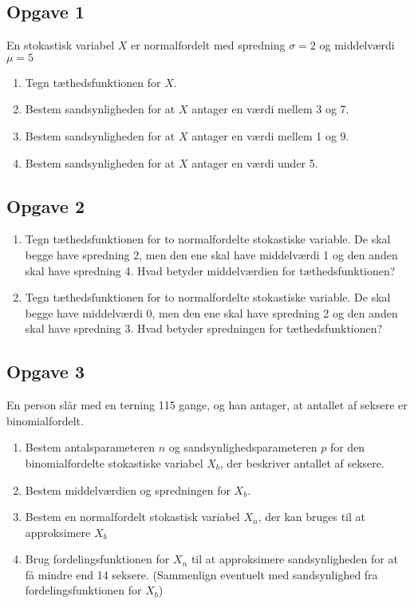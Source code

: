 
\subsection*{Opgave 1}
En stokastisk variabel $X$ er normalfordelt med spredning $\sigma = 2$ og middelværdi $\mu = 5$

\begin{enumerate}[label=\roman*)	]
	\item Tegn tæthedsfunktionen for $X$. 
	\item Bestem sandsynligheden for at $X$ antager en værdi mellem 3 og 7.
	\item Bestem sandsynligheden for at $X$ antager en værdi mellem 1 og 9.
	\item Bestem sandsynligheden for at $X$ antager en værdi under 5.
\end{enumerate}


\subsection*{Opgave 2}

\begin{enumerate}[label=\roman*)]
	\item Tegn tæthedsfunktionen for to normalfordelte stokastiske variable. De skal begge have spredning 2, men den ene skal have middelværdi 1 og den anden skal have spredning 4. Hvad betyder middelværdien for tæthedsfunktionen?
	\item Tegn tæthedsfunktionen for to normalfordelte stokastiske variable. De skal begge have middelværdi 0, men den ene skal have spredning 2 og den anden skal have spredning 3. Hvad betyder spredningen for tæthedsfunktionen?
\end{enumerate}

\subsection*{Opgave 3}

En person slår med en terning 115 gange, og han antager, at antallet af seksere er binomialfordelt. 
\begin{enumerate}[label=\roman*)]
	\item Bestem antalsparameteren $n$ og sandsynlighedsparameteren $p$ for den binomialfordelte stokastiske variabel $X_b$, der beskriver antallet af seksere.
	\item Bestem middelværdien og spredningen for $X_b$.
	\item Bestem en normalfordelt stokastisk variabel $X_n$, der kan bruges til at approksimere $X_b$
	\item Brug fordelingsfunktionen for $X_n$ til at approksimere sandsynligheden for at få mindre end 14 seksere. (Sammenlign eventuelt med sandsynlighed fra fordelingsfunktionen for $X_b$)
\end{enumerate}


